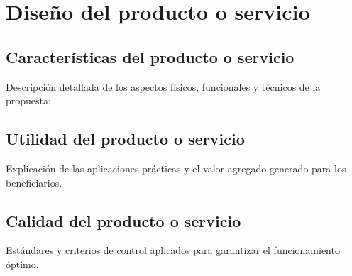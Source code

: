 \section{Diseño del producto o servicio}
\label{sec:diseno}

\subsection{Características del producto o servicio}
Descripción detallada de los aspectos físicos, funcionales y técnicos de la propuesta:



\subsection{Utilidad del producto o servicio}
Explicación de las aplicaciones prácticas y el valor agregado generado para los beneficiarios.

\subsection{Calidad del producto o servicio}
Estándares y criterios de control aplicados para garantizar el funcionamiento óptimo.

